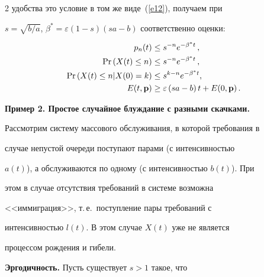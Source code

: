 \begin{multicols}{2}
удобства это условие в том же виде~(\ref{e12}), получаем при


$s=\sqrt{b/a}$, $\beta^* = \varepsilon


\left(1-s\right)\left(sa -b\right)$ соответственно оценки:


\begin{align*}


p_n(t) &\leq s^{-n} e^{- \beta^* t}\,, %


\\


\Pr \left(X(t) \le n \right) &\leq s^{-n} e^{- \beta^* t}\,,




\\


\Pr \left (X(t) \le n | X(0) = k \right)& \leq s^{k-n} e^{- \beta^* t}, %


\\


 E(t,{\bf p}) &\ge  \varepsilon  \left(sa -b\right)t


  +  E(0,{\bf p})\,. 




\end{align*}


          


\bigskip


          


\noindent


{\bf Пример 2. Простое случайное блуждание  с разными скачками.}


Рассмотрим систему массового обслуживания, в которой требования в


случае не\-пус\-той очереди поступают парами (с ин\-тен\-сив\-ностью


$a(t)$), а обслуживаются по одному (с ин\-тен\-сив\-ностью $b(t)$). При


этом в случае отсутствия требований в системе возможна


<<иммиграция>>, т.\,е.\ поступление пары  требований с


интенсивностью $l(t)$. В этом случае $X(t)$ уже не является


процессом рождения и гибели.





{\bf Эргодичность.} Пусть существует $s>1$ такое, что



\end{multicols}
